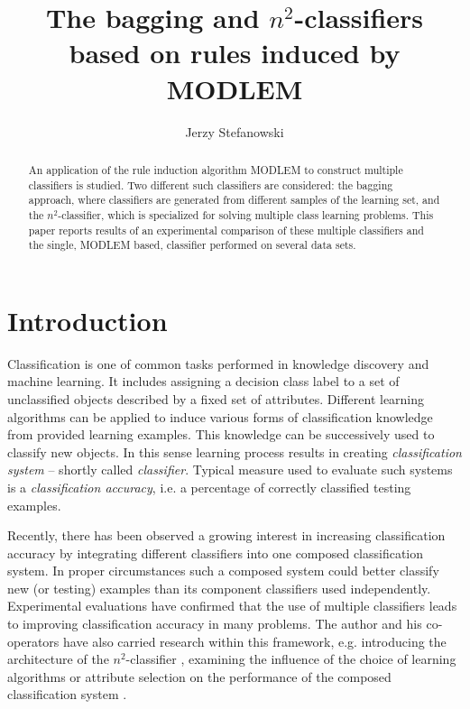 \documentclass{llncs}
\begin{document}
\title{The bagging and $n^2$-classifiers based on rules induced by MODLEM}


\author{Jerzy Stefanowski}



\maketitle

\begin{abstract}
An application of the rule induction algorithm MODLEM to construct multiple
classifiers is studied. Two different  such classifiers are considered: the
bagging approach, where classifiers are generated from different samples of
the learning set, and the $n^2$-classifier, which is specialized for solving
multiple class learning problems. This paper reports results of an
experimental comparison of these multiple classifiers and the single, MODLEM
based, classifier performed on several data sets.
\end{abstract}

\section{Introduction}

Classification is one of common tasks performed in knowledge
discovery and machine learning. It includes assigning a decision
class label to a set of unclassified objects described by a fixed
set of attributes. Different learning algorithms can be applied to
induce various forms of classification knowledge from provided
learning examples. This knowledge can be successively used to
classify new objects. In this sense learning process results in
creating \emph{classification system} -- shortly called
\emph{classifier}. Typical measure used to evaluate such systems
is a \emph{classification accuracy}, i.e. a percentage of
correctly classified testing examples.

Recently, there has been observed a growing interest in increasing
classification accuracy by integrating different classifiers into one
composed classification system. In proper circumstances such a composed
system could better classify new (or testing) examples than its component
classifiers used independently. Experimental evaluations have confirmed that
the use of multiple classifiers leads to improving classification accuracy
in many problems. The author and his co-operators have also carried research
within this framework, e.g. introducing the architecture of the
$n^2$-classifier \cite{JelStef98}, examining the influence of the choice of
learning algorithms or attribute selection on the performance of the
composed classification system \cite{JelStef98,JelStef01,habcia}.
\end{document}
